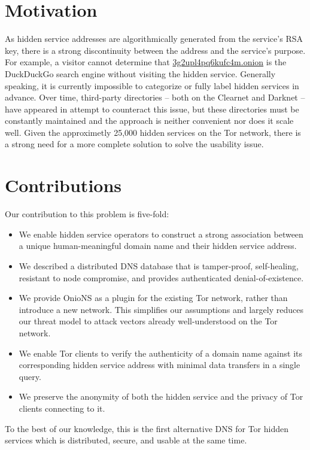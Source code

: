 \section{Motivation}
\label{sec:Motivation}

As hidden service addresses are algorithmically generated from the service's RSA key, there is a strong discontinuity between the address and the service's purpose. For example, a visitor cannot determine that \url{3g2upl4pq6kufc4m.onion} is the DuckDuckGo search engine without visiting the hidden service. Generally speaking, it is currently impossible to categorize or fully label hidden services in advance. Over time, third-party directories -- both on the Clearnet and Darknet -- have appeared in attempt to counteract this issue, but these directories must be constantly maintained and the approach is neither convenient nor does it scale well. Given the approximetly 25,000 hidden services on the Tor network, there is a strong need for a more complete solution to solve the usability issue.

\section{Contributions}

Our contribution to this problem is five-fold:

\begin{itemize}
	\item We enable hidden service operators to construct a strong association between a unique human-meaningful domain name and their hidden service address.
	\item We described a distributed DNS database that is tamper-proof, self-healing, resistant to node compromise, and provides authenticated denial-of-existence.
	\item We provide OnioNS as a plugin for the existing Tor network, rather than introduce a new network. This simplifies our assumptions and largely reduces our threat model to attack vectors already well-understood on the Tor network.
	\item We enable Tor clients to verify the authenticity of a domain name against its corresponding hidden service address with minimal data transfers in a single query.
	\item We preserve the anonymity of both the hidden service and the privacy of Tor clients connecting to it.
\end{itemize}

To the best of our knowledge, this is the first alternative DNS for Tor hidden services which is distributed, secure, and usable at the same time.
